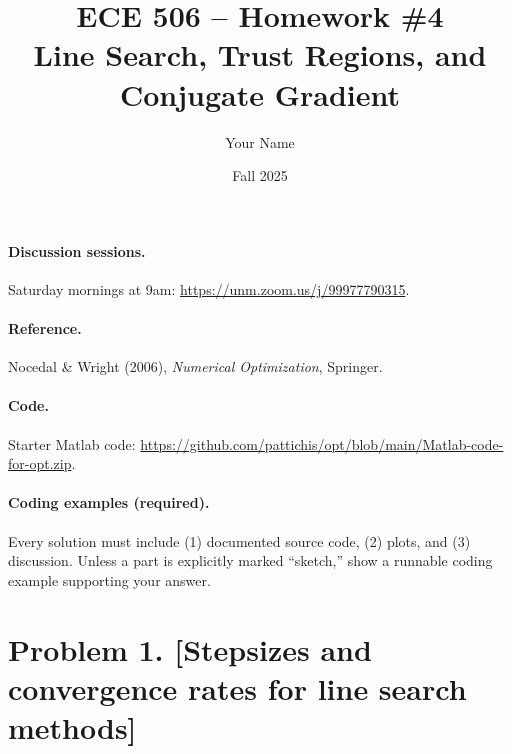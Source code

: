 \documentclass[11pt]{article}
\title{ECE 506 \;–\; Homework \#4 \\ \large Line Search, Trust Regions, and Conjugate Gradient}
\author{Your Name}
\date{Fall 2025}
\begin{document}
	\maketitle
	\thispagestyle{empty}
	
	\pagestyle{fancy}
	\fancyhf{} %
	\lhead{\today}
	\cfoot{\thepage}
	
	\paragraph{Discussion sessions.}
	Saturday mornings at 9am: \url{https://unm.zoom.us/j/99977790315}.
	
	\paragraph{Reference.}
	Nocedal \& Wright (2006), \emph{Numerical Optimization}, Springer.
	
	\paragraph{Code.}
	Starter Matlab code: \url{https://github.com/pattichis/opt/blob/main/Matlab-code-for-opt.zip}.
	
	\paragraph{Coding examples (required).}
	Every solution must include (1) documented source code, (2) plots, and (3) discussion. Unless a part is explicitly marked “sketch,” show a runnable coding example supporting your answer.
	
	\newpage
	
	\section*{Problem 1. [Stepsizes and convergence rates for line search methods]}
	
\end{document}
